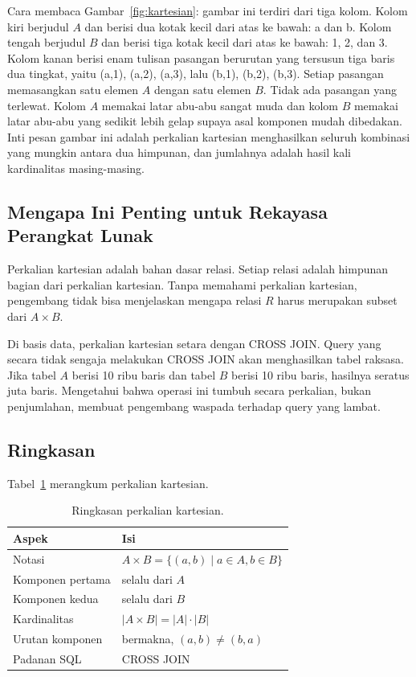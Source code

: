 \documentclass[11pt,a4paper]{article}
\begin{document}
Cara membaca Gambar~\ref{fig:kartesian}: gambar ini terdiri dari tiga kolom. Kolom kiri berjudul $A$ dan berisi dua kotak kecil dari atas ke bawah: a dan b. Kolom tengah berjudul $B$ dan berisi tiga kotak kecil dari atas ke bawah: 1, 2, dan 3. Kolom kanan berisi enam tulisan pasangan berurutan yang tersusun tiga baris dua tingkat, yaitu (a,1), (a,2), (a,3), lalu (b,1), (b,2), (b,3). Setiap pasangan memasangkan satu elemen $A$ dengan satu elemen $B$. Tidak ada pasangan yang terlewat. Kolom $A$ memakai latar abu-abu sangat muda dan kolom $B$ memakai latar abu-abu yang sedikit lebih gelap supaya asal komponen mudah dibedakan. Inti pesan gambar ini adalah perkalian kartesian menghasilkan seluruh kombinasi yang mungkin antara dua himpunan, dan jumlahnya adalah hasil kali kardinalitas masing-masing.

\subsection{Mengapa Ini Penting untuk Rekayasa Perangkat Lunak}

Perkalian kartesian adalah bahan dasar relasi. Setiap relasi adalah himpunan bagian dari perkalian kartesian. Tanpa memahami perkalian kartesian, pengembang tidak bisa menjelaskan mengapa relasi $R$ harus merupakan subset dari $A \times B$.

Di basis data, perkalian kartesian setara dengan CROSS JOIN. Query yang secara tidak sengaja melakukan CROSS JOIN akan menghasilkan tabel raksasa. Jika tabel $A$ berisi 10 ribu baris dan tabel $B$ berisi 10 ribu baris, hasilnya seratus juta baris. Mengetahui bahwa operasi ini tumbuh secara perkalian, bukan penjumlahan, membuat pengembang waspada terhadap query yang lambat.

\subsection{Ringkasan}

Tabel~\ref{tab:kartesian} merangkum perkalian kartesian.

\begin{table}[H]
	\centering
	\caption{Ringkasan perkalian kartesian.}
	\label{tab:kartesian}
	\small
	\begin{tabularx}{\textwidth}{l X}
		\toprule
		Aspek            & Isi                                          \\
		\midrule
		Notasi           & $A \times B=\{(a,b) \mid a \in A, b \in B\}$ \\
		Komponen pertama & selalu dari $A$                              \\
		Komponen kedua   & selalu dari $B$                              \\
		Kardinalitas     & $|A \times B|=|A| \cdot |B|$                 \\
		Urutan komponen  & bermakna, $(a,b) \ne (b,a)$                  \\
		Padanan SQL      & CROSS JOIN                                   \\
		\bottomrule
	\end{tabularx}
\end{table}
\end{document}
